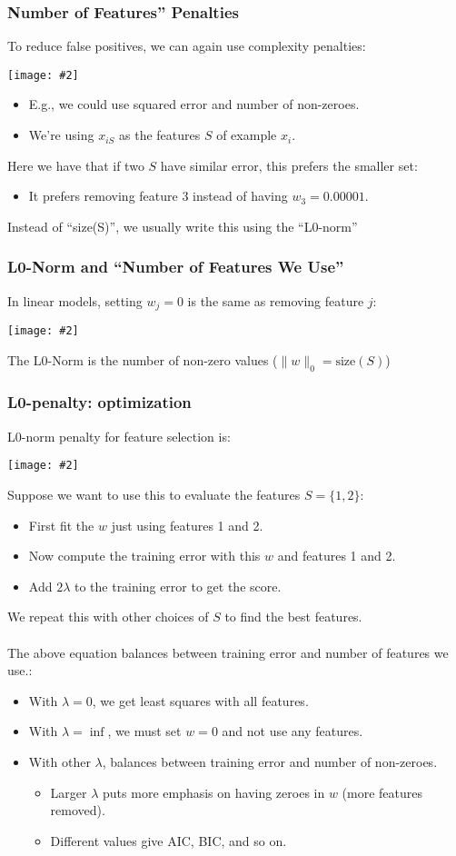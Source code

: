 \documentclass{article}
\def\red#1{{\color{red}#1}}
\def\norm#1{\|#1\|}
\newcommand{\centerfig}[2]{\begin{center}\texttt{[image: \#2]}\end{center}}
\begin{document}
\subsubsection*{Number of Features” Penalties}
To reduce false positives, we can again use complexity penalties:
\centerfig{0.75}{comp-pen-1}
\begin{itemize}[label = -]
	\item E.g., we could use squared error and number of non-zeroes. 
	\item We’re using $ x_{iS} $ as the features $ S $ of example $ x_i $.
\end{itemize}
Here we have that if two $ S $ have similar error, this prefers the smaller set:
\begin{itemize}[label=-]
	\item It prefers removing feature 3 instead of having $ w_3 = 0.00001 $.
\end{itemize}
Instead of “size(S)”, we usually write this using the “L0-norm”

\subsubsection*{L0-Norm and “Number of Features We Use”}
In linear models, \red{setting $ w_j = 0 $ is the same as removing feature $ j $}:
\centerfig{0.65}{L0-norm-1}
The L0-Norm is the number of non-zero values ($ \norm{w}_0 = \text{size}(S) $)


\subsubsection*{L0-penalty: optimization}
L0-norm penalty for feature selection is:
\centerfig{0.5}{L0-norm-2}
Suppose we want to use this to evaluate the features $ S=\{1,2\} $: 
\begin{itemize}
	\item First fit the $ w $ just using features 1 and 2.
	\item Now compute the training error with this $ w $ and features 1 and 2. 
	\item Add $ 2 \lambda $ to the training error to get the score.
\end{itemize}
We repeat this with other choices of $ S $ to find the best features. \\ \\
The above equation balances between training error and number of features we use.:
\begin{itemize}
	\item With $ \lambda=0 $, we get least squares with all features.
	\item With $ \lambda = \inf $, we must set $ w=0 $ and not use any features.
	\item With other $\lambda$, balances between training error and number of non-zeroes.
	\begin{itemize}
		\item Larger $\lambda$ puts more emphasis on having zeroes in $ w $ (more features removed).
		\item Different values give AIC, BIC, and so on.
	\end{itemize}
\end{itemize}
\end{document}
